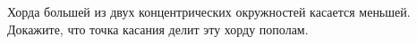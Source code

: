 \begin{ex}
	\begin{condition}
		Хорда большей из двух концентрических окружностей касается меньшей. Докажите, что точка касания делит эту хорду пополам.
	\end{condition}
\end{ex}